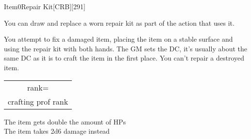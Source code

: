 
\begin{card}{Item}{0}{Repair Kit}[CRB][291]


You can draw and replace a worn repair kit as part of the action that uses it.

You attempt to fix a damaged item, placing the item on a stable surface and using the repair kit with both hands.
The GM sets the DC, it's usually about the same DC as it is to craft the item in the first place.
You can't repair a destroyed item.

 \begin{tabular}{c}rank=\\crafting prof rank\end{tabular}

 The item gets double the amount of HPs \\
 The item takes 2d6 damage instead
\vfill

\end{card}
